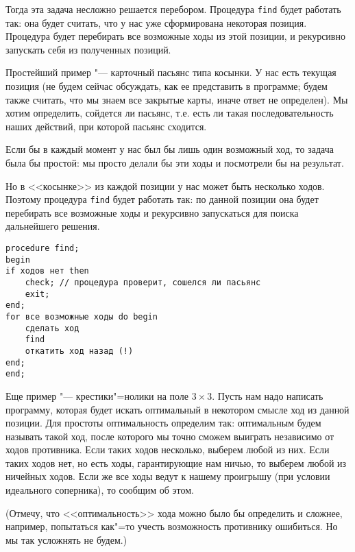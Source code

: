 Тогда эта задача несложно решается перебором. 
Процедура \verb`find` будет работать так: она будет считать, что у нас уже сформирована некоторая позиция. 
Процедура будет перебирать все возможные ходы из этой позиции, и рекурсивно запускать себя из полученных позиций. 

Простейший пример "--- карточный пасьянс типа косынки. 
У нас есть текущая позиция (не будем сейчас обсуждать, как ее представить в программе; будем также считать,
что мы знаем все закрытые карты, иначе ответ не определен).
Мы хотим определить, сойдется ли пасьянс, т.е. есть ли такая последовательность наших действий, при которой пасьянс сходится.

Если бы в каждый момент у нас был бы лишь один возможный ход, то задача была бы простой: мы просто делали бы эти ходы
и посмотрели бы на результат.

Но в <<косынке>> из каждой позиции у нас может быть несколько ходов. 
Поэтому процедура \verb`find` будет работать так: по данной позиции она будет перебирать все возможные ходы
и рекурсивно запускаться для поиска дальнейшего решения.

\begin{codesampleo}\begin{verbatim}
procedure find; 
begin
if ходов нет then
    check; // процедура проверит, сошелся ли пасьянс
    exit;
end;
for все возможные ходы do begin
    сделать ход
    find
    откатить ход назад (!)
end;
end;
\end{verbatim}
\end{codesampleo}

Еще пример "--- крестики"=нолики на поле $3\times 3$. 
Пусть нам надо написать программу, которая будет искать оптимальный в некотором смысле ход из данной позиции.
Для простоты оптимальность определим так: оптимальным будем называть такой ход, после которого мы точно сможем выиграть
независимо от ходов противника. 
Если таких ходов несколько, выберем любой из них. 
Если таких ходов нет, но есть ходы, гарантирующие нам ничью, то выберем любой из ничейных ходов.
Если же все ходы ведут к нашему проигрышу (при условии идеального соперника), то сообщим об этом.

(Отмечу, что <<оптимальность>> хода можно было бы определить и сложнее, например, попытаться как"=то учесть возможность
противнику ошибиться. Но мы так усложнять не будем.)

